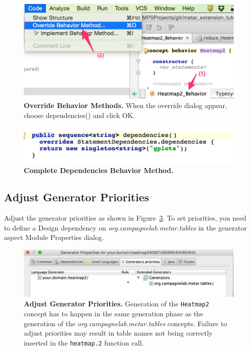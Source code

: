 \begin{figure}
  \centering
  \includegraphics[width=\figWidthNarrow]{figures/CreateBehaviorAndOverride.png}
\caption[Override Behavior Methods.]{\textbf{Override Behavior Methods.} When the override dialog appear, choose dependencies() and click OK.}
\label{fig:CreateBehaviorAndOverride}
\end{figure}


\begin{figure}
  \centering
  \includegraphics[width=\figWidthSmall]{figures/dependenciesMethodComplete.png}
\caption[Complete Dependencies Behavior Method.]{\textbf{Complete Dependencies Behavior Method.}}
\label{fig:dependenciesMethodComplete}
\end{figure}

\subsection{Adjust Generator Priorities}
Adjust the generator priorities as shown in Figure~\ref{fig:Generator_Properties_your_domain_heatmap2}. To set priorities, you need to define a Design dependency on \textit{org.campagnelab.metar.tables} in the generator aspect Module Properties dialog. 

\begin{figure}[h!tbp]
  \centering
  \includegraphics[width=\figWidthWide]{figures/Generator_Properties_your_domain_heatmap2.png}
\caption[Adjust Generator Priorities.]{\textbf{Adjust Generator Priorities.} Generation of the \texttt{Heatmap2} concept has to happen in the same generation phase as the generation of the  \textit{org.campagnelab.metar.tables} concepts. Failure to adjust priorities may result in table names not being correctly inserted in the \texttt{heatmap.2} function call.}
\label{fig:Generator_Properties_your_domain_heatmap2}
\end{figure}

